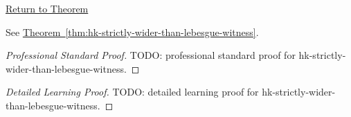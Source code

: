 \newpage
{}
\label{prf:hk-strictly-wider-than-lebesgue-witness}

\begin{remark*}[Return]
\hyperref[thm:hk-strictly-wider-than-lebesgue-witness]{Return to Theorem}
\end{remark*}

\begin{theorem*}
See \hyperref[thm:hk-strictly-wider-than-lebesgue-witness]{Theorem~\ref*{thm:hk-strictly-wider-than-lebesgue-witness}}.
\end{theorem*}

\begin{proof}[Professional Standard Proof]
\LRAProofBodyStart
TODO: professional standard proof for hk-strictly-wider-than-lebesgue-witness.
\end{proof}

\begin{proof}[Detailed Learning Proof]
\LRAProofBodyStart
TODO: detailed learning proof for hk-strictly-wider-than-lebesgue-witness.
\end{proof}

\begin{remark*}
\end{remark*}

\begin{dependencies}
\NoLocalDependencies
\end{dependencies}

\clearpage

